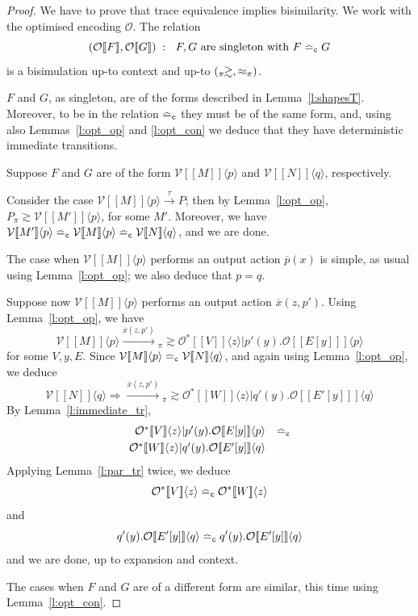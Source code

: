\documentclass[11pt,a4paper]{amsart}
\theoremstyle{plain}
\theoremstyle{definition}
\theoremstyle{defC}
\theoremstyle{thmC}
\theoremstyle{plain}
\numberwithin{equation}{section}
\newcommand{\obj}[1]{\langle #1 \rangle}
\def\inp#1#2{#1(#2)}
\def\bout#1#2{\overline{#1}(#2)}   %
\def\app#1#2{#1\obj{#2}}                    %
\newcommand{\rmm}[1]{{\tt{\lowercase{#1}}}}
\newcommand{\arr}[1]{\mathrel{\stackrel{{#1}}{\longrightarrow}}}  %
\newcommand{\genTE}[1]{\mathrel{\bumpeq_{\rmm{\lowercase{#1}}}}}       %
\newcommand{\genwb}[1]{\mathrel{\approx_{\rmm{\lowercase{#1}}}}}       %
\newcommand{\wbPI}{\genwb{\pi}}       %
\newcommand{\TEp}{\genTE{C}}       %
\newcommand{\contr}{\mathrel{\mbox{}_{\pi}\!\!\gtrsim}}
\newcommand{\exn}{\contr} %
\def\st{\; : \;}
\newcommand{\FF}{F}
\newcommand{\GG}{G}
\newcommand{\encoIa}[2]{\cbvSymb \app{[\! [ #1 ] \! ]}{#2}  }
\newcommand{\cbvSymb}{{\mathcal {V}}}
\newcommand{\encoEnvV}[1]{{\mathcal {O}} [\! [ #1 ] \! ]  } %
\newcommand{\encoConV}{\encoEnvV} %
\newcommand{\encoV}[1]{{\mathcal O}[\![#1]\!]}  %
\newcommand{\qencV}{{\mathcal O}}  %
\newcommand{\encoVa}[2]{\app{\encoV{#1} }{#2}} %
\newcommand{\encoVVa}[2]{\app{\encoVV{#1}}{#2}}  %
\newcommand{\encoVV}[1]{{\mathcal O}^\variant[\![#1]\!]} %
\newcommand{\variant}{*} %
\newcommand{\val}{V}
\newcommand{\evctxt}{\ensuremath{E  }} %
\theoremstyle{plain}
\theoremstyle{definition}
\begin{document}
\begin{proof}
We have to prove that trace equivalence
implies bisimilarity. 
We work with the optimised encoding  $\qencV$.
The relation 
\[ 
(\encoConV \FF,  \encoConV \GG) \st \mbox{ $\FF,\GG$ are singleton
  with $\FF \TEp 
\GG$}
\]
is a bisimulation up-to context and up-to $(\contr,
 \wbPI)$. 


 $\FF$ and $\GG$, as singleton, are of the  forms 
described in Lemma~\ref{l:shapesT}.
Moreover, to be in the relation $ \TEp$ they must be of the same
form, and, using also 
  Lemmas~\ref{l:opt_op}  and 
\ref{l:opt_con} we deduce that they have deterministic immediate
transitions. 

Suppose  $\FF$ and $\GG$ are of the form 
$\encoIa {M} p$ and 
$\encoIa {N} q$, respectively.

Consider the case 
$\encoIa {M} p \arr\tau P$; then by Lemma~\ref{l:opt_op}, 
$P \contr \encoIa {M'} p$, for some $M'$. 
Moreover, we have $ \encoIa {M'} p \TEp \encoIa {M} p \TEp  \encoIa
{N} q$, and we are done. 


The case when $\encoIa {M} p$ performs an output action $\bout px$ is
simple, as usual using  Lemma~\ref{l:opt_op}; we also deduce that
$p=q$. 

Suppose now $\encoIa {M} p$ performs an output action $\bout x{z,p'}$.
Using  Lemma~\ref{l:opt_op}, we have 
\[\encoIa {M} p\arr{\bout x{z,p'}}  
\exn \encoVVa \val z|\inp {p'} y.\encoVa {\evctxt[y]} p
\]
for some $\val,y,E$.
Since $\encoIa {M}p \TEp \encoIa {N}q$, and again using 
 Lemma~\ref{l:opt_op},
we deduce 
\[\encoIa {N} q\Longrightarrow \arr{\bout x{z,p'}}  
\exn \encoVVa W z|\inp {q'} y.\encoVa {E'[y]} q
\]
By Lemma~\ref{l:immediate_tr}, 
\[
\begin{array}{rc}
\encoVVa \val z|\inp {p'} y.\encoVa {\evctxt[y]} p
& \TEp \\[3pt]
\encoVVa W z|\inp {q'} y.\encoVa {E'[y]} q
\end{array}
 \] 
Applying Lemma~\ref{l:par_tr} twice, we deduce 
\[
\encoVVa \val z 
\TEp 
\encoVVa W z
 \]
 and
\[
\inp {q'} y.\encoVa {E'[y]} q \TEp
\inp {q'} y.\encoVa {E'[y]} q
\]
and we are done, up to expansion and context. 


\noindent The cases when
$\FF$ and $\GG$ are of a different form are similar, this time using 
Lemma~\ref{l:opt_con}.
\end{proof}              

   


\end{document}

